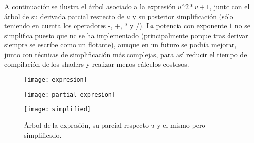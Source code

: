 \newpage
A continuación se ilustra el árbol asociado a la expresión  $u^\wedge 2 * v + 1$, junto con el árbol de su derivada parcial respecto de $u$ y su posterior simplificación (sólo teniendo en cuenta los operadores -, +, * y /). La potencia con exponente $1$ no se simplifica puesto que no se ha implementado (principalmente porque tras derivar siempre se escribe como un flotante), aunque en un futuro se podría mejorar, junto con técnicas de simplificación más complejas, para así reducir el tiempo de compilación de los shaders y realizar menos cálculos costosos.

\begin{figure}[h]
		\begin{minipage}{0.35\textwidth}
  			\centering
		  	\texttt{[image: expresion]}
		\end{minipage}\hfill
		\begin{minipage}{0.4\textwidth}
  			\centering
		  	\texttt{[image: partial\_expresion]}
		\end{minipage}\hfill
		\begin{minipage}{0.23\textwidth}
  			\centering
		  	\texttt{[image: simplified]}
		\end{minipage}\hfill
	\caption{Árbol de la expresión, su parcial respecto $u$ y el mismo pero simplificado.}
  	\label{fig:arbol_expresion}
\end{figure}

\endinput
